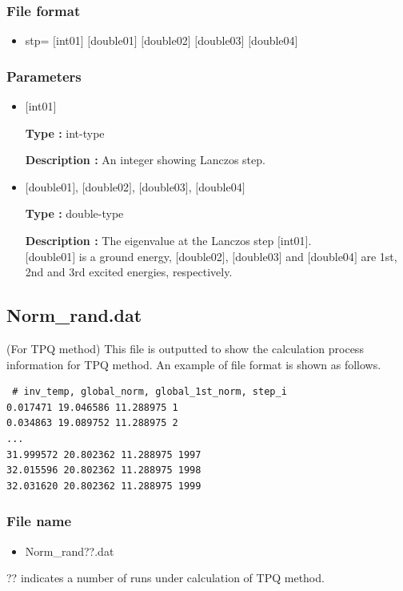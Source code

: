 \subsubsection{File format}
 \begin{itemize}
   \item stp= $[$int01$]$ $[$double01$]$ $[$double02$]$ $[$double03$]$ $[$double04$]$
  \end{itemize}
\subsubsection{Parameters}
 \begin{itemize}

  \item  $[$int01$]$
  
 {\bf Type :} int-type

{\bf Description :} An integer showing Lanczos step.
 
  \item  $[$double01$]$, $[$double02$]$, $[$double03$]$, $[$double04$]$

 {\bf Type :} double-type 

{\bf Description :} The eigenvalue at the Lanczos step $[$int01$]$.\\
$[$double01$]$ is a ground energy, $[$double02$]$, $[$double03$]$ and $[$double04$]$ are 1st, 2nd and 3rd excited energies, respectively.

 \end{itemize}

\newpage
\subsection{Norm\_rand.dat}
\label{Subsec:normrand}
(For TPQ method) This file is outputted to show the calculation process information for TPQ method.
An example of file format is shown as follows.\\
\begin{minipage}{12.5cm}
\begin{screen}
\begin{verbatim}
 # inv_temp, global_norm, global_1st_norm, step_i 
0.017471 19.046586 11.288975 1
0.034863 19.089752 11.288975 2
...
31.999572 20.802362 11.288975 1997
32.015596 20.802362 11.288975 1998
32.031620 20.802362 11.288975 1999
\end{verbatim}
\end{screen}
\end{minipage}

\subsubsection{File name}
 \begin{itemize}
   \item Norm\_rand??.dat
  \end{itemize}
  ?? indicates a number of runs under calculation of TPQ method.

